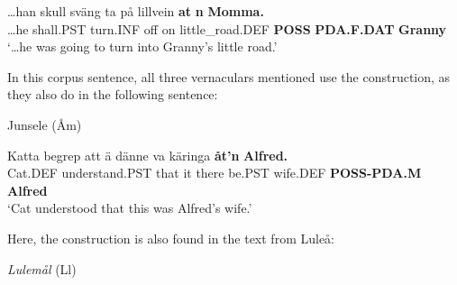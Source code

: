  \ea\label{}
\gll …han  skull  sväng  ta  på  lillvein  \textbf{at} \textbf{n} \textbf{Momma.}\\


…he  shall.PST  turn.INF  off  on  little\_road.DEF  \textbf{POSS} \textbf{PDA.F.DAT} \textbf{Granny}\\

\glt ‘…he was going to turn into Granny’s little road.’

\z

In this corpus sentence, all three vernaculars mentioned use the  construction, as they also do in the following sentence:


\item 

\label{bkm:Ref137369876}Junsele (Åm)



 \ea\label{}
\gll Katta  begrep  att  ä  dänne  va  käringa  \textbf{åt’n} \textbf{Alfred.}\\


Cat.DEF  understand.PST  that  it  there  be.PST  wife.DEF  \textbf{POSS-PDA.M} \textbf{Alfred}\\

\glt ‘Cat understood that this was Alfred’s wife.’

\z

Here, the construction is also found in the text from Luleå:


\item 

\textit{Lulemål} (Ll)




